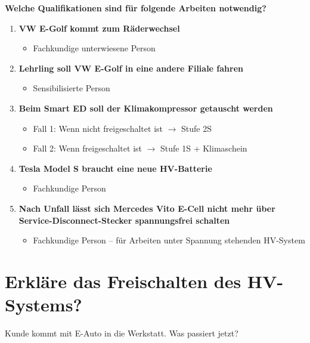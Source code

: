 \textbf{Welche Qualifikationen sind für folgende Arbeiten notwendig?}

\begin{enumerate}
\item
  \textbf{VW E-Golf kommt zum Räderwechsel}

  \begin{itemize}
  \item
    Fachkundige unterwiesene Person
  \end{itemize}
\item
  \textbf{Lehrling soll VW E-Golf in eine andere Filiale fahren}

  \begin{itemize}
  \item
    Sensibilisierte Person
  \end{itemize}
\item
  \textbf{Beim Smart ED soll der Klimakompressor getauscht werden}

  \begin{itemize}
  \item
    Fall 1: Wenn nicht freigeschaltet ist $\to$ Stufe 2S
  \item
    Fall 2: Wenn freigeschaltet ist $\to$ Stufe 1S + Klimaschein
  \end{itemize}
\item
  \textbf{Tesla Model S braucht eine neue HV-Batterie}

  \begin{itemize}
  \item
    Fachkundige Person
  \end{itemize}
\item
  \textbf{Nach Unfall lässt sich Mercedes Vito E-Cell nicht mehr über
  Service-Disconnect-Stecker spannungsfrei schalten}

  \begin{itemize}
  \item
    Fachkundige Person -- für Arbeiten unter Spannung stehenden
    HV-System
  \end{itemize}
\end{enumerate}

\section{Erkläre das Freischalten des
HV-Systems?}\label{erklaere-das-freischalten-des-hv-systems}

Kunde kommt mit E-Auto in die Werkstatt. Was passiert jetzt?

